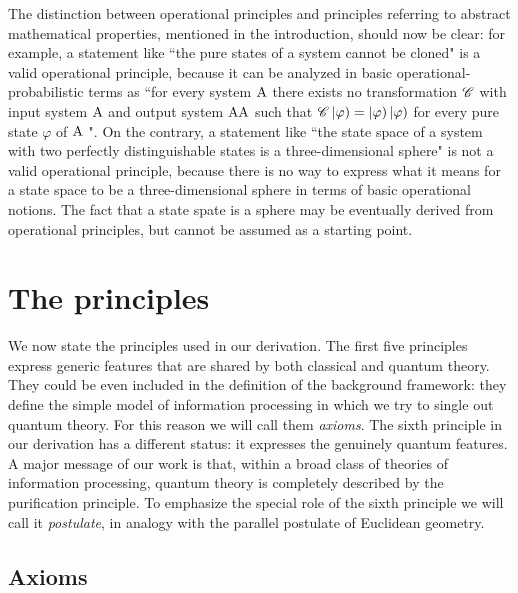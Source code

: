 \documentclass[12pt,aps,pra,showpacs,groupedaddress]{revtex4-1}
\def\K#1{\left|#1\right)}  \def\B#1{\left(#1\right|}
\begin{document}
The distinction between operational principles and principles referring to abstract mathematical
properties, mentioned in the introduction, should now be clear: for example, a statement like ``the
pure states of a system cannot be cloned" is a valid operational principle, because it can be
analyzed in basic operational-probabilistic terms as ``for every system ${\rm A}$ there exists no transformation $\mathscr C $ with input
system ${\rm A}$ and output system ${\rm A}{\rm A}$ such that $\tC \K \varphi = \K \varphi \K\varphi$ for every
pure state $\varphi$ of ${\rm A}$ ".  On the contrary, a statement like ``the state space of a system
with two perfectly distinguishable states is a three-dimensional sphere" is not a valid operational principle, because
there is no way to express what it means for a state space to be a three-dimensional sphere in terms of basic operational notions.  The fact that a state spate is a sphere may be eventually derived from operational principles, but cannot be assumed as a starting point.   

  

\section{The principles}\label{sec:principles}
We now state the principles used in our derivation.  The first five
principles express generic features that are shared by both classical
and quantum theory. They could be even included in the definition of
the background framework: they define the simple model of information
processing in which we try to single out quantum theory.  For this
reason we will call them \emph{axioms}.  The sixth principle in our
derivation has a different status: it expresses the genuinely quantum
features.  
A major message of our work is that, within a broad class of theories of information processing, quantum theory is completely described by the purification principle. 
To emphasize the special role of the sixth principle we will call it \emph{postulate}, in analogy with
the parallel postulate of Euclidean geometry.





\subsection{Axioms}
\end{document}
